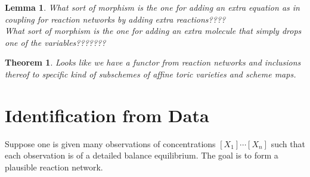 \documentclass[11pt]{book}
\theoremstyle{change}
\newtheorem{thm}[equation]{Theorem}
\newtheorem{lemma}[equation]{Lemma}
\theoremstyle{nonumberplain}
\numberwithin{equation}{section}
\begin{document}
\begin{lemma}
What sort of morphism is the one for adding an extra equation as in coupling for reaction networks by adding extra reactions????\\
What sort of morphism is the one for adding an extra molecule that simply drops one of the variables???????\\
\end{lemma}

\begin{thm}
Looks like we have a functor from reaction networks and inclusions thereof to specific kind of subschemes of affine toric varieties and scheme maps.
\end{thm}

\section{Identification from Data}

Suppose one is given many observations of concentrations $[X_1] \cdots [X_n]$ such that each observation is of a detailed balance equilibrium. The goal is to form a plausible reaction network.
\end{document}
